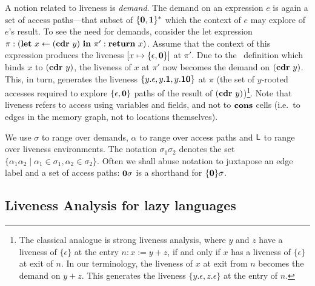 \documentclass[10pt]{sigplanconf}
\begin{document}
A  notion related  to  liveness is  {\em  demand}.  The  demand on  an
expression  $e$  is again  a  set  of  access paths---that  subset  of
$\{\mathbf{0},\mathbf{1}\}^\ast$ which  the context of $e$ may  explore of $e$'s
result.   To see  the need  for demands,  consider the  let expression
$\pi:(\mbox{$\mathbf{ let}$}~x\leftarrow (\mbox{$\mathbf{cdr}$}~y)~\mbox{$\mathbf{ in}$}~ \pi':\mbox{$\mathbf{ return}$}~x)$. Assume that the
context of  this expression produces the liveness  $[x \mapsto \lbrace
  \epsilon, \mathbf{0}  \rbrace]$ at $\pi'$.   Due to the  \LET\ definition
which  binds $x$  to $(\mbox{$\mathbf{cdr}$}~y)$,  the liveness  of $x$  at  $\pi'$ now
becomes  the  demand on  $(\mbox{$\mathbf{cdr}$}~y)$.   This,  in  turn, generates  the
liveness $\lbrace y.\epsilon,  y.\mathbf{1}, y.\mathbf{1}\mathbf{0} \rbrace$ at $\pi$
(the set of $y$-rooted accesses required to explore $\lbrace \epsilon,
\mathbf{0}  \rbrace$  paths  of  the  result  of  $(\mbox{$\mathbf{cdr}$}~y)$)\footnote{The
  classical analogue  is strong liveness  analysis, where $y$  and $z$
  have  a  liveness  of  $\lbrace\epsilon\rbrace$  at  the  entry  $n:
  x:=y+z$,    if   and    only   if    $x$   has    a    liveness   of
  $\lbrace\epsilon\rbrace$ at  exit of  $n$.  In our  terminology, the
  liveness of $x$  at exit from $n$ becomes the  demand on $y+z$. This
  generates the  liveness $\lbrace y.\epsilon,  z.\epsilon \rbrace$ at
  the entry of $n$.}.
Note that  liveness refers to  access using variables and  fields, and
not  to $\mbox{$\mathbf{cons}$}$  cells (i.e.\  to edges  in the  memory graph,  not to
locations themselves).

We use $\sigma$  to range over demands, $\alpha$  to range over access
paths  and $\mathsf{L}$ to  range over  liveness environments.   The notation
$\sigma_1\sigma_2$  denotes  the  set $\lbrace  \alpha_1\alpha_2  \mid
\alpha_1 \in \sigma_1, \alpha_2  \in \sigma_2\rbrace$.  Often we shall
abuse notation to  juxtapose an edge label and a  set of access paths:
$\mathbf{0}\sigma$ is a shorthand for $\lbrace\mathbf{0}\rbrace\sigma$.

\subsection{Liveness Analysis for lazy languages}
\end{document}
